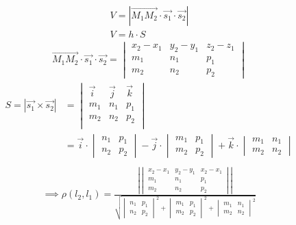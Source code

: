 \begin{answer}
\begin{gather*}
  V = |\overrightarrow{M_1M_2} \cdot \vec{s_1} \cdot \vec{s_2}| \\
  V= h \cdot S
\end{gather*}
\begin{gather*}
  \overrightarrow{M_1M_2} \cdot \vec{s_1} \cdot \vec{s_2} = 
  \begin{vmatrix}
    x_2 - x_1 & y_2 - y_1 & z_2 - z_1 \\
    m_1 & n_1 & p_1 \\
    m_2 & n_2 & p_2
  \end{vmatrix}
\end{gather*}
\begin{align*}
  S = |\vec{s_1} \times \vec{s_2}| &= 
  \begin{vmatrix}
    \vec{i} & \vec{j} & \vec{k} \\
    m_1 & n_1 & p_1 \\
    m_2 & n_2 & p_2 \\
  \end{vmatrix} \\
  &=
  \vec{i} \cdot 
  \begin{vmatrix}
    n_1 & p_1 \\
    n_2 & p_2
  \end{vmatrix} - \vec{j} \cdot 
  \begin{vmatrix}
    m_1 & p_1 \\
    m_2 & p_2
  \end{vmatrix} + \vec{k} \cdot 
  \begin{vmatrix}
    m_1 & n_1 \\
    m_2 & n_2
  \end{vmatrix} \\
\end{align*}
\begin{gather*}
  \implies \boxed{\rho(l_2, l_1) = 
  \frac{
    \left|
    \begin{vmatrix}
      x_2 - x_1 & y_2 - y_1 & x_2 - x_1 \\
      m_1 & n_1 & p_1 \\
      m_2 & n_2 & p_2
    \end{vmatrix}
    \right| 
  }{
  \sqrt{
    \begin{vmatrix}
      n_1 & p_1 \\
      n_2 & p_2
    \end{vmatrix}^2 +
    \begin{vmatrix}
      m_1 & p_1 \\
      m_2 & p_2
    \end{vmatrix}^2 +  
    \begin{vmatrix}
      m_1 & n_1 \\
      m_2 & n_2
    \end{vmatrix}^2 
  } 
  }}
\end{gather*}
\end{answer}

